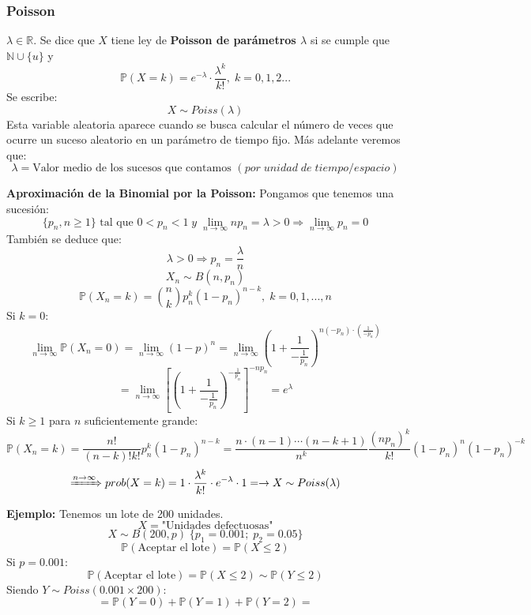\documentclass[11pt]{article}
\newcommand{\N}{\mathbb{N}}
\newcommand{\R}{\mathbb{R}}
\newcommand{\prob}{\mathbb{P}}
\theoremstyle{plain}
\begin{document}
            \subsubsection{Poisson}
            \label{subsub:poisson}
                $\lambda \in \R$. Se dice que $X$ tiene ley de \textbf{Poisson de parámetros $\lambda$} si se cumple que $\N \cup \{u\}$ y
                \[\prob(X=k) = e^{-\lambda} \cdot \frac{\lambda^{k}}{k!}, \; k=0,1,2...\]
                Se escribe:
                \[X \sim Poiss(\lambda)\]
                Esta variable aleatoria aparece cuando se busca calcular el número de veces que ocurre un suceso aleatorio en un parámetro de tiempo fijo. Más adelante veremos que:
                \[\lambda = \text{Valor medio de los sucesos que contamos } (por \;unidad \;de \; tiempo/espacio) \]


                \textbf{Aproximación de la Binomial por la Poisson:} Pongamos que tenemos una sucesión:
                \[\{p_n,n\ge 1\} \text{ tal que } 0 < p_n < 1 \; y \; \lim_{n\to\infty} np_n = \lambda > 0 \Rightarrow \lim_{n\to\infty} p_n = 0\]
                También se deduce que:
                \[\lambda > 0 \Rightarrow p_n = \frac{\lambda}{n}\]
                \[X_n \sim B(n,p_n)\]
                \[\prob(X_n = k) = \binom{n}{k} p_n^k (1-p_n)^{n-k}, \; k=0,1,...,n\]
                Si $k=0$:
                \[\lim_{n\to\infty} \prob(X_n = 0) = \lim_{n\to\infty} (1-p)^n = \lim_{n\to\infty} (1+\frac{1}{-\frac{1}{p_n}})^{n(-p_n)\cdot(\frac{1}{-p_n})}\]
                \[=\lim_{n\to\infty} [(1 + \frac{1}{-\frac{1}{p_n}})^{-\frac{1}{p_n}}]^{-np_n} = e^\lambda\]
                Si $k\ge1$ para $n$ suficientemente grande:
                \[\prob(X_n=k) = \frac{n!}{(n-k)!k!} p_n^k (1-p_n)^{n-k} = \frac{n\cdot(n-1) \cdots (n-k+1)}{n^k} \frac{(np_n)^k}{k!} (1-p_n)^n (1-p_n)^{-k} \]
                \[\xRightarrow{n \to \infty} prob(X=k) = 1 \cdot \frac{\lambda^{k}}{k!} \cdot e^{-\lambda} \cdot 1 = \rightarrow X \sim Poiss(\lambda)\]


                 \textbf{Ejemplo:} Tenemos un lote de 200 unidades.
                 \[X = \text{"Unidades defectuosas"}\]
                 \[X \sim B(200,p)\; \{p_1 = 0.001 ; \; p_2 = 0.05\} \]
                 \[\prob(\text{Aceptar el lote}) = \prob(X \le 2)\]
                 Si $p=0.001$:
                 \[\prob(\text{Aceptar el lote}) = \prob(X \le 2) \sim \prob(Y\le 2)\]
                 Siendo $Y \sim Poiss(0.001\times200)$:
                 \[=\prob(Y=0)+\prob(Y=1)+\prob(Y=2) = \]
\end{document}
